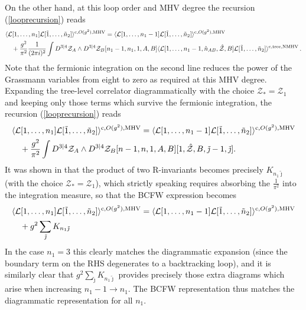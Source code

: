 \documentclass[12pt]{article}
\numberwithin{equation}{section}
\begin{document}
On the other hand, at this loop order and MHV degree the recursion (\ref{looprecursion}) reads
\begin{align}
    &\langle \mathcal{L}[1,\ldots,n_1] \mathcal{L}[\tilde{1},\ldots,\tilde{n}_2]\rangle^{\textrm{c},O(g^2),\textrm{MHV}} = \langle \mathcal{L}[1,\ldots,n_1-1] \mathcal{L}[\tilde{1},\ldots,\tilde{n}_2]\rangle^{\textrm{c},O(g^2),\textrm{MHV}} \notag \\
   &\quad +\frac{g^2}{\pi^2} \frac{1}{(2 \pi i)^2} \int D^{3|4}\mathcal{Z}_A \wedge D^{3|4}\mathcal{Z}_B [n_1-1,n_1,1,A,B] \langle \mathcal{L}[1,\ldots,n_1-1,\hat{n}_{AB},\hat{\mathcal{Z}},B] \mathcal{L}[\tilde{1},\ldots,\tilde{n}_2]\rangle^{\textrm{c,tree,NMHV}} \,.
\end{align}
Note that the fermionic integration on the second line reduces the power of the Grassmann variables from eight to zero as required at this MHV degree. Expanding the tree-level correlator diagrammatically with the choice \(\mathcal{Z}_* = \mathcal{Z}_1\) and keeping only those terms which survive the fermionic integration, the
recursion (\ref{looprecursion}) reads
\begin{align}
    &\langle \mathcal{L}[1,\ldots,n_1] \mathcal{L}[\tilde{1},\ldots,\tilde{n}_2]\rangle^{\textrm{c},O(g^2),\textrm{MHV}}= \langle \mathcal{L}[1,\ldots,n_1-1] \mathcal{L}[\tilde{1},\ldots,\tilde{n}_2]\rangle^{\textrm{c},O(g^2),\textrm{MHV}}  \notag \\
   &\quad +\frac{g^2}{\pi^2} \int D^{3|4}\mathcal{Z}_A \wedge D^{3|4}\mathcal{Z}_B [n-1,n,1,A,B][1,\hat{\mathcal{Z}},B,\tilde{\jmath}-1,\tilde{\jmath}].
\end{align}
It was shown in \cite{Arkani-Hamed:2010zjl} that the product of two R-invariants becomes precisely \(K_{n_1 \tilde{\jmath}}\) (with the choice \(\mathcal{Z}_* = \mathcal{Z}_1\)), which strictly speaking requires absorbing the \(\frac{1}{\pi^2}\) into the integration measure, so that the BCFW expression becomes
\begin{align}
    &\langle \mathcal{L}[1,\ldots,n_1] \mathcal{L}[\tilde{1},\ldots,\tilde{n}_2]\rangle^{\textrm{c},O(g^2),\textrm{MHV}}  = \langle \mathcal{L}[1,\ldots,n_1-1] \mathcal{L}[\tilde{1},\ldots,\tilde{n}_2]\rangle^{\textrm{c},O(g^2),\textrm{MHV}}  \notag \\
   &\quad +g^2 \sum_{\tilde{\jmath}}K_{n_1 \tilde{\jmath}}
\end{align}
In the case \(n_1 = 3\) this clearly matches the diagrammatic expansion (since the boundary term on the RHS degenerates to a backtracking loop), and it is similarly clear that \(g^2 \sum_{\tilde{\jmath}}K_{n_1 \tilde{\jmath}}\) provides precisely those extra diagrams which arise when increasing \(n_1-1 \to n_1\). The BCFW representation thus matches the diagrammatic representation for all \(n_1\).
\end{document}
